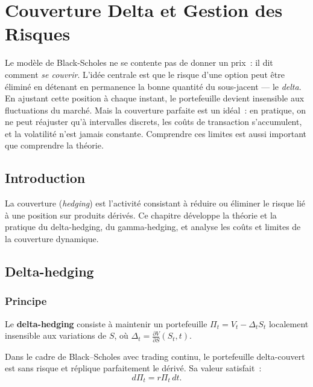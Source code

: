 \chapter{Couverture Delta et Gestion des Risques}
\label{ch:couverture}

Le mod\`ele de Black-Scholes ne se contente pas de donner un prix~: il dit comment \emph{se couvrir}. L'id\'ee centrale est que le risque d'une option peut \^etre \'elimin\'e en d\'etenant en permanence la bonne quantit\'e du sous-jacent --- le \emph{delta}. En ajustant cette position \`a chaque instant, le portefeuille devient insensible aux fluctuations du march\'e. Mais la couverture parfaite est un id\'eal~: en pratique, on ne peut r\'eajuster qu'\`a intervalles discrets, les co\^uts de transaction s'accumulent, et la volatilit\'e n'est jamais constante. Comprendre ces limites est aussi important que comprendre la th\'eorie.

\section{Introduction}

La couverture (\textit{hedging}) est l'activit\'e consistant \`a r\'eduire
ou \'eliminer le risque li\'e \`a une position sur produits d\'eriv\'es.
Ce chapitre d\'eveloppe la th\'eorie et la pratique du delta-hedging,
du gamma-hedging, et analyse les co\^uts et limites de la couverture
dynamique.

\section{Delta-hedging}

\subsection{Principe}

\begin{definition}
Le \textbf{delta-hedging} consiste \`a maintenir un portefeuille
$\Pi_t = V_t - \Delta_t S_t$
localement insensible aux variations de $S$, o\`u
$\Delta_t = \frac{\partial V}{\partial S}(S_t, t)$.
\end{definition}

\begin{theoreme}
Dans le cadre de Black--Scholes avec trading continu, le portefeuille
delta-couvert est sans risque et r\'eplique parfaitement le d\'eriv\'e.
Sa valeur satisfait~:
\[
    d\Pi_t = r\Pi_t\,dt.
\]
\end{theoreme}

